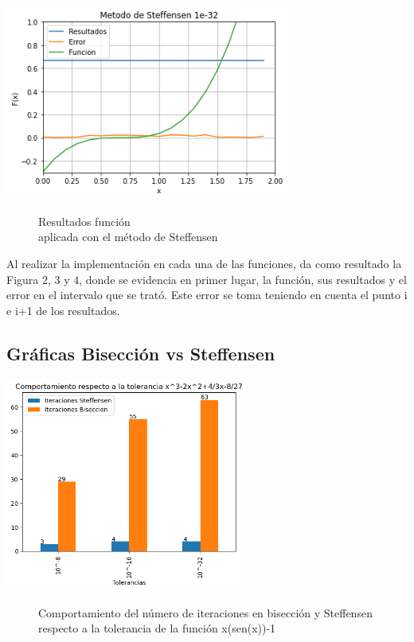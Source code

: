 \documentclass[]{hdsr}
\begin{document}
    \begin{center}
        \includegraphics[width=0.7\textwidth]{figs/polzoom.png} 
        \begin{figure}[H]
            \centering
            \caption{}
            \label{fig:my_label}
            Resultados función \\\hspace{0.2cm} aplicada con el método de Steffensen\\
        \end{figure}
    \end{center}
    
    Al realizar la implementación en cada una de las funciones, da como resultado la Figura 2, 3 y 4, donde se evidencia en primer lugar, la función, sus resultados y el error en el intervalo que se trató. Este error se toma teniendo en cuenta el punto i e i+1 de los resultados.
    \hfill
    \hspace{5pt}
            
                
                    
                   
    
    
    \subsection{Gráficas Bisección vs Steffensen}
    
    \begin{center}
        \includegraphics[width=0.6\textwidth]{figs/seno.png} 
        \begin{figure}[h]
            \centering
            \caption{}
            \label{fig:my_label5}
            Comportamiento del número de iteraciones en bisección y Steffensen respecto a la tolerancia de la función x(sen(x))-1\\
        \end{figure}
    \end{center}
    \hfill
    
\end{document}
